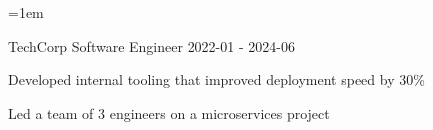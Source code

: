 

\emergencystretch=1em   %
\sloppy                 %

\begin{cventries}

        \cventry
          {TechCorp} %
          {Software Engineer} %
          {} %
          {2022-01 - 2024-06} %
          {
            \begin{cvitems} %
            \item {Developed internal tooling that improved deployment speed by 30\%}
    \item {Led a team of 3 engineers on a microservices project}
            \end{cvitems}
          }
\end{cventries}
